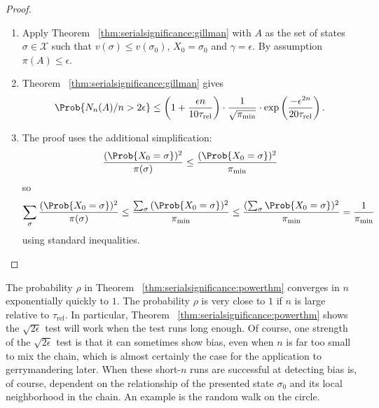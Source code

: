 \documentclass[12pt]{article}
\begin{document}
\begin{proof}
    \begin{enumerate}
        \item
            Apply Theorem~%
            \ref{thm:serialsignificance:gillman} with \( A \) as the set
            of states \( \sigma \in \mathcal{X} \) such that \( v(\sigma)
            \le v(\sigma_0) \), \( X_0 = \sigma_0 \) and \( \gamma =
            \epsilon \).  By assumption \( \pi(A) \le \epsilon \).
        \item
            Theorem~%
            \ref{thm:serialsignificance:gillman} gives
            \[
                \Prob{N_{n}(A)/n > 2\epsilon} \le \left( 1 + \frac{\epsilon
                n}{10 \tau_{\text{rel}}} \right) \cdot \frac{1}{\sqrt{\pi_
                {\min}}} \cdot \exp \left( \frac{-\epsilon^{2 n}}{20
                \tau_{\text{rel}}} \right).
            \]
        \item
            The proof uses the additional simplification:
            \[
                \frac{(\Prob{X_0 = \sigma})^2}{\pi (\sigma)} \le \frac{(\Prob
                {X_0 = \sigma})^2}{\pi_{\min}}
            \] so
            \[
                \sum_{\sigma} \frac{(\Prob{X_0 =\sigma})^2}{\pi (\sigma)}
                \le \frac{\sum_{\sigma}{(\Prob{X_0 =\sigma})^2}}{\pi_{\min}}
                \le \frac{(\sum_{\sigma}\Prob{X_0 =\sigma})^2}{\pi_{\min}}
                = \frac{1}{\pi_{\min}}
            \] using standard inequalities.
    \end{enumerate}
\end{proof}

\begin{remark}
    The probability \( \rho \) in Theorem~%
    \ref{thm:serialsignificance:powerthm} converges in \( n \)
    exponentially quickly to \( 1 \).  The probability \( \rho \) is
    very close to \( 1 \) if \( n \) is large relative to \( \tau_{\text
    {rel}} \).  In particular, Theorem~%
    \ref{thm:serialsignificance:powerthm} shows the \( \sqrt{2\epsilon} \)
    test will work when the test runs long enough.  Of course, one
    strength of the \( \sqrt{2\epsilon} \) test is that it can sometimes
    show bias, even when \( n \) is far too small to mix the chain,
    which is almost certainly the case for the application to
    gerrymandering later.  When these short-\( n \) runs are successful
    at detecting bias is, of course, dependent on the relationship of
    the presented state \( \sigma_0 \) and its local neighborhood in the
    chain.  An example is the random walk on the circle.
\end{remark}
\end{document}

